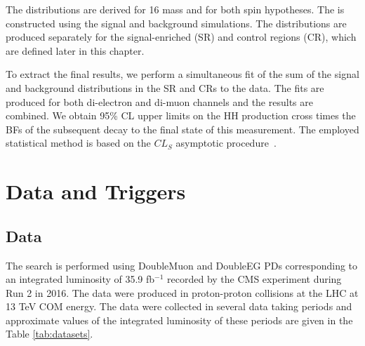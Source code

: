 The \mTHH distributions are derived for 16 mass and for both spin hypotheses. The \mTHH is constructed using the signal and background simulations. The distributions are produced separately for the signal-enriched (SR) and control regions (CR), which are defined later in this chapter.

To extract the final results, we perform a simultaneous fit of the sum of the signal and background \mTHH distributions in the SR and CRs to the data. The fits are produced for both di-electron and di-muon channels and the results are combined. We obtain 95\% CL upper limits on the HH production cross times the BFs of the subsequent decay to the final state of this measurement. The employed statistical method is based on the $CL_{S}$ asymptotic procedure~\cite{Zech:1988un}.

\section{Data and Triggers}
\label{sec:data_and_triggers}

\subsection{Data}
The search is performed using DoubleMuon and DoubleEG PDs corresponding to an integrated luminosity of 35.9 fb$^{-1}$ recorded by the CMS experiment during Run 2 in 2016. The data were produced in proton-proton collisions at the LHC at 13 TeV COM energy. The data were collected in several data taking periods and approximate values of the integrated luminosity of these periods are given in the Table \ref{tab:datasets}.

